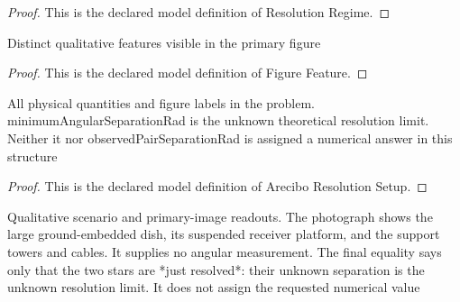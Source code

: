 \begin{proof}
  This is the declared model definition of Resolution Regime.
\end{proof}
\begin{definition}
  \label{def:physics:phyx-mini-0132:phyxminiproblems-problemphyxmini0132-figurefeature}
  Distinct qualitative features visible in the primary figure
\end{definition}
\begin{proof}
  This is the declared model definition of Figure Feature.
\end{proof}
\begin{definition}
  \label{def:physics:phyx-mini-0132:phyxminiproblems-problemphyxmini0132-areciboresolutionsetup}
  All physical quantities and figure labels in the problem. minimumAngularSeparationRad is the unknown theoretical resolution limit. Neither it nor observedPairSeparationRad is assigned a numerical answer in this structure
\end{definition}
\begin{proof}
  This is the declared model definition of Arecibo Resolution Setup.
\end{proof}
\begin{definition}
  \label{def:physics:phyx-mini-0132:phyxminiproblems-problemphyxmini0132-matchesscenarioandfigure}
  Qualitative scenario and primary-image readouts. The photograph shows the large ground-embedded dish, its suspended receiver platform, and the support towers and cables. It supplies no angular measurement. The final equality says only that the two stars are *just resolved*: their unknown separation is the unknown resolution limit. It does not assign the requested numerical value
\end{definition}
